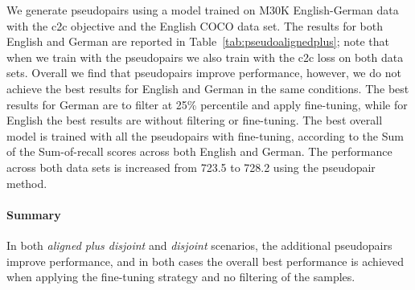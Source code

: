We generate pseudopairs using a model trained on M30K English-German data with the c2c objective and the English
COCO data set. The results for both English and German are reported in Table~\ref{tab:pseudoalignedplus}; note that when we train with the pseudopairs we also train with the c2c loss on both data sets.  
Overall we find that pseudopairs 
improve performance, however, we do not achieve the 
best results for English and German in the same conditions. The best results for German are to filter at 25\% percentile and apply fine-tuning, 
while for English the best results are without filtering or fine-tuning. The best overall model is trained with
all the pseudopairs with fine-tuning, according to the Sum of the Sum-of-recall scores across 
both English and German.
The performance across both data sets is increased from 723.5 to 728.2 using the pseudopair method.

\paragraph{Summary}
In both \emph{aligned plus disjoint} and \emph{disjoint} scenarios, the 
additional pseudopairs improve performance, and in both cases the overall 
best performance is achieved when applying the 
fine-tuning strategy and no filtering of the samples.

